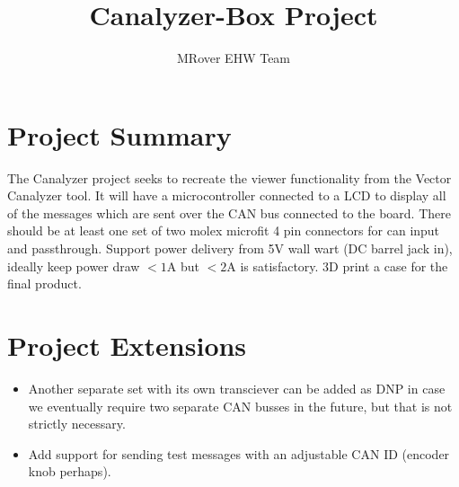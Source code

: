 \documentclass{article}
\title{Canalyzer-Box Project}
\author{MRover EHW Team}
\begin{document}
\maketitle
\section{Project Summary}
The Canalyzer project seeks to recreate the viewer functionality from the Vector
Canalyzer tool.  It will have a microcontroller connected to a LCD to display all of
the messages which are sent over the CAN bus connected to the board.  There should be
at least one set of two molex microfit 4 pin connectors for can input and passthrough.
Support power delivery from 5V wall wart (DC barrel jack in), ideally keep power draw 
$<1$A but $<2$A is satisfactory.  3D print a case for the final product.

\section{Project Extensions}
\begin{itemize}
\item Another separate set with its own transciever can be added as DNP in case we eventually
require two separate CAN busses in the future, but that is not strictly necessary.
\item Add support for sending test messages with an adjustable CAN ID (encoder knob perhaps).
\end{itemize}
\end{document}
